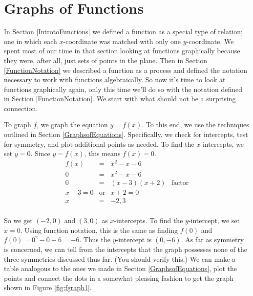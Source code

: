 \section{Graphs of Functions}
\label{GraphsofFunctions}

In Section \ref{IntrotoFunctions} we defined a function as a special type of relation; one in which each $x$-coordinate was matched with only one $y$-coordinate.  We spent most of our time in that section looking at functions graphically because they were, after all, just sets of points in the plane. Then in Section \ref{FunctionNotation} we described a function as a process and defined the notation necessary to work with functions algebraically.  So now it's time to look at functions graphically again, only this time we'll do so with the notation defined in Section \ref{FunctionNotation}.  We start with what should not be a surprising connection.


{
To graph $f$, we graph the equation $y = f(x)$.  To this end, we use the techniques outlined in Section \ref{GraphsofEquations}.  Specifically, we check for intercepts, test for symmetry, and plot additional points as needed.  To find the $x$-intercepts, we set $y=0$. Since $y = f(x)$, this means $f(x) = 0$. 
\[
\begin{array}{rclr}   
f(x) & = & x^2 - x - 6 & \\ 
0 & = & x^2 - x - 6 & \\ 
0 & = & (x-3)(x+2) & \mbox{factor} \\ 
x-3 = 0 & \mbox{or} & x+2 = 0 & \\
x & = & -2, 3 & \\
\end{array} 
\]

So we get $(-2,0)$ and $(3,0)$ as $x$-intercepts.  To find the $y$-intercept, we set $x=0$.  Using function notation, this is the same as finding $f(0)$ and  $f(0) = 0^2 - 0 - 6 = -6.$  Thus the $y$-intercept is $(0,-6)$.  As far as symmetry is concerned, we can tell from the intercepts that the graph possesses none of the three symmetries discussed thus far. (You should verify this.)  We can make a table analogous to the ones we made in Section \ref{GraphsofEquations}, plot the points and connect the dots in a somewhat pleasing fashion to get the graph shown in Figure \ref{fig:fgraph1}.
}

